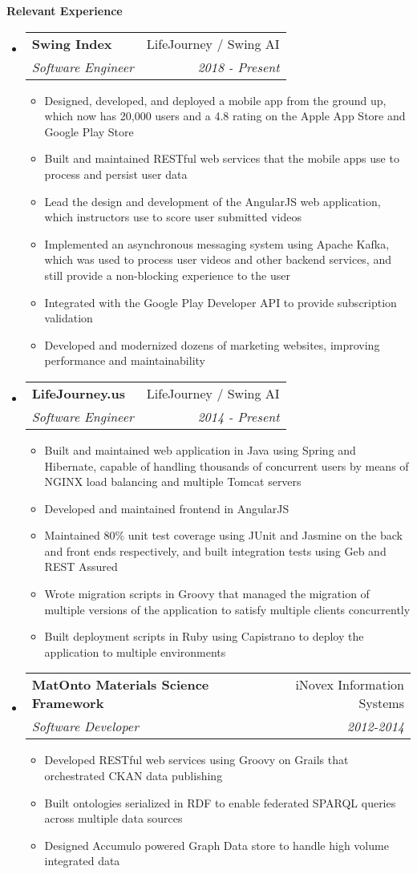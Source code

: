 \documentclass[letterpaper,11pt]{article}
\makeatletter
\newcommand{\resitem}[1]{\item #1 \vspace{-2pt}}
\newcommand{\resheading}[1]{{\large \colorbox{mygrey}{\begin{minipage}{\textwidth}{\textbf{#1 \vphantom{p\^{E}}}}\end{minipage}}}}
\newcommand{\ressubheading}[4]{
    \begin{tabular*}{7.0in}{l@{\extracolsep{\fill}}r}
        \textbf{#1} & #2 \\
        \textit{#3} & \textit{#4} \\
    \end{tabular*}\vspace{-6pt}}
\makeatother
\begin{document}
    \resheading{Relevant Experience}
    \begin{itemize}
        \item
        \ressubheading{Swing Index}{LifeJourney / Swing AI}{Software Engineer}{2018 - Present}
        \begin{itemize}
            \resitem{Designed, developed, and deployed a mobile app from the ground up, which now has 20,000 users and a 4.8 rating on the Apple App Store and Google Play Store}
            \resitem{Built and maintained RESTful web services that the mobile apps use to process and persist user data}
            \resitem{Lead the design and development of the AngularJS web application, which instructors use to score user submitted videos}
            \resitem{Implemented an asynchronous messaging system using Apache Kafka, which was used to process user videos and other backend services, and still provide a non-blocking experience to the user}
            \resitem{Integrated with the Google Play Developer API to provide subscription validation}
            \resitem{Developed and modernized dozens of marketing websites, improving performance and maintainability}
        \end{itemize}

        \item
        \ressubheading{LifeJourney.us}{LifeJourney / Swing AI}{Software Engineer}{2014 - Present}
        \begin{itemize}
            \resitem{Built and maintained web application in Java using Spring and Hibernate, capable of handling thousands of concurrent users by means of NGINX load balancing and multiple Tomcat servers}
            \resitem{Developed and maintained frontend in AngularJS}
            \resitem{Maintained 80\% unit test coverage using JUnit and Jasmine on the back and front ends respectively, and built integration tests using Geb and REST Assured}
            \resitem{Wrote migration scripts in Groovy that managed the migration of multiple versions of the application to satisfy multiple clients concurrently}
            \resitem{Built deployment scripts in Ruby using Capistrano to deploy the application to multiple environments}
        \end{itemize}

        \item
        \ressubheading{MatOnto Materials Science Framework}{iNovex Information Systems}{Software Developer}{2012-2014}
        \begin{itemize}
            \resitem{Developed RESTful web services using Groovy on Grails that orchestrated CKAN data publishing}
            \resitem{Built ontologies serialized in RDF to enable federated SPARQL queries across multiple data sources}
            \resitem{Designed Accumulo powered Graph Data store to handle high volume integrated data}
        \end{itemize}

    \end{itemize}
\end{document}
